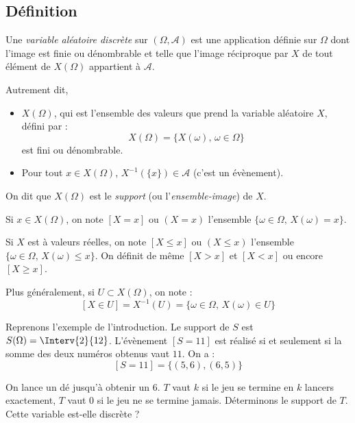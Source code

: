 \documentclass[a4paper,10pt]{report}
\begin{document}
\subsection{Définition}
\begin{defin}
Une \textit{variable aléatoire discrète} sur $(\Omega, \mathcal{A})$ est une application définie sur $\Omega$ dont l'image est finie ou dénombrable et telle que l'image réciproque par $X$ de tout élément de $X(\Omega)$ appartient à $\mathcal{A}$.
\end{defin}
Autrement dit,
\begin{itemize}
\item $X(\Omega)$, qui est l'ensemble des valeurs que prend la variable aléatoire $X$, défini par :
$$  X(\Omega) = \{X(\omega), \, \omega \in \Omega\} $$
est fini ou dénombrable.
\item Pour tout $x \in X(\Omega)$, $X^{-1}(\lbrace x \rbrace) \in \mathcal{A}$ (c'est un évènement).
\end{itemize}

\medskip

\begin{notas}
\item On dit que $X(\Omega)$ est le \textit{support} (ou l'\textit{ensemble-image}) de $X$.
\item Si $x \in X(\Omega)$, on note $[X = x]$ ou $(X=x)$ l'ensemble $\lbrace \omega \in \Omega, \, X(\omega)=x \rbrace$.
\item Si $X$ est à valeurs réelles, on note $[X \leq x]$ ou $(X \leq x)$ l'ensemble $\lbrace \omega \in \Omega, \, X(\omega) \leq x \rbrace$. On définit de même $[X>x]$ et $[X<x]$ ou encore $[X \geq x]$.
\item Plus généralement, si $U \subset X(\Omega)$, on note :
$$[X\in U] = X^{-1}(U)= \lbrace \omega \in \Omega, \, X(\omega) \in U \rbrace$$
\end{notas}

\begin{ex} Reprenons l'exemple de l'introduction. Le support de $S$ est $S(\Omega) = \Interv{2}{12}$. L'évènement $[S=11]$ est réalisé si et seulement si la somme des deux numéros obtenus vaut $11$. On a :
\[ [S=11] = \lbrace (5,6), (6,5) \rbrace\]
\end{ex}

\begin{ex} On lance un dé jusqu'à obtenir un 6. $T$ vaut $k$ si le jeu se termine en $k$ lancers exactement, $T$ vaut 0 si le jeu ne se termine jamais. Déterminons le support de $T$. Cette variable est-elle discrète ?

\vspace{2cm}
\end{ex}
\end{document}
